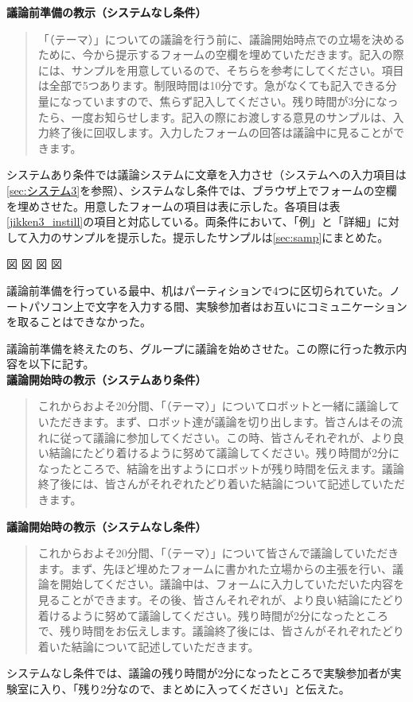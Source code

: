 \documentclass[11pt, a4paper]{jreport} %
\begin{document}
\textbf{議論前準備の教示（システムなし条件）}
\begin{quote}
「（テーマ）」についての議論を行う前に、議論開始時点での立場を決めるために、今から提示するフォームの空欄を埋めていただきます。記入の際には、サンプルを用意しているので、そちらを参考にしてください。項目は全部で5つあります。制限時間は10分です。急がなくても記入できる分量になっていますので、焦らず記入してください。残り時間が3分になったら、一度お知らせします。記入の際にお渡しする意見のサンプルは、入力終了後に回収します。入力したフォームの回答は議論中に見ることができます。
\end{quote}


システムあり条件では議論システムに文章を入力させ（システムへの入力項目は\ref{sec:システム3}を参照）、システムなし条件では、ブラウザ上でフォームの空欄を埋めさせた。用意したフォームの項目は表に示した。各項目は表\ref{jikken3_instill}の項目と対応している。両条件において、「例」と「詳細」に対して入力のサンプルを提示した。提示したサンプルは\ref{sec:samp}にまとめた。

図
図
図
図


議論前準備を行っている最中、机はパーティションで4つに区切られていた。ノートパソコン上で文字を入力する間、実験参加者はお互いにコミュニケーションを取ることはできなかった。

議論前準備を終えたのち、グループに議論を始めさせた。この際に行った教示内容を以下に記す。\\
\textbf{議論開始時の教示（システムあり条件）}
\begin{quote}
これからおよそ20分間、「（テーマ）」についてロボットと一緒に議論していただきます。まず、ロボット達が議論を切り出します。皆さんはその流れに従って議論に参加してください。この時、皆さんそれぞれが、より良い結論にたどり着けるように努めて議論してください。残り時間が2分になったところで、結論を出すようにロボットが残り時間を伝えます。議論終了後には、皆さんがそれぞれたどり着いた結論について記述していただきます。
\end{quote}

\textbf{議論開始時の教示（システムなし条件）}
\begin{quote}
これからおよそ20分間、「（テーマ）」について皆さんで議論していただきます。まず、先ほど埋めたフォームに書かれた立場からの主張を行い、議論を開始してください。議論中は、フォームに入力していただいた内容を見ることができます。その後、皆さんそれぞれが、より良い結論にたどり着けるように努めて議論してください。残り時間が2分になったところで、残り時間をお伝えします。議論終了後には、皆さんがそれぞれたどり着いた結論について記述していただきます。
\end{quote}
システムなし条件では、議論の残り時間が2分になったところで実験参加者が実験室に入り、「残り2分なので、まとめに入ってください」と伝えた。
\end{document}

